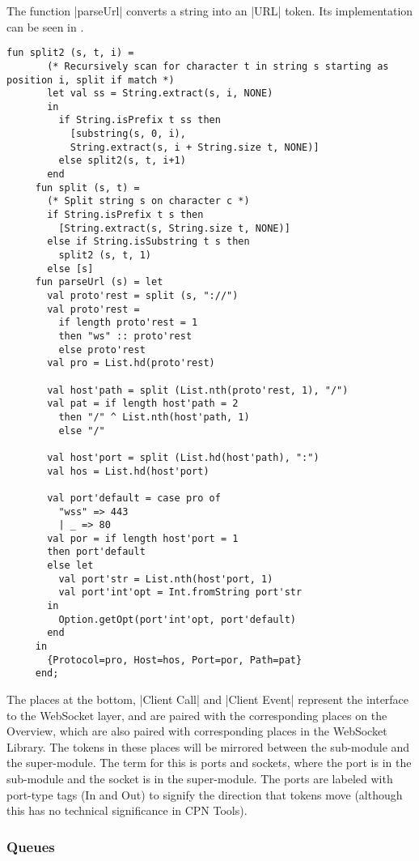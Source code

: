 	The function |parseUrl| converts a string into an |URL| token. Its
	implementation can be seen in . 
	
	\begin{lstlisting}[label=lst:client_app_parseUrl,caption=parseUrl and related
	functions,gobble=1,float] 
	fun split2 (s, t, i) =
	   (* Recursively scan for character t in string s starting as position i, split if match *)
	   let val ss = String.extract(s, i, NONE) 
	   in 
	     if String.isPrefix t ss then
	       [substring(s, 0, i), 
	       String.extract(s, i + String.size t, NONE)]
	     else split2(s, t, i+1)
	   end
	 fun split (s, t) = 
	   (* Split string s on character c *)
	   if String.isPrefix t s then
	     [String.extract(s, String.size t, NONE)]
	   else if String.isSubstring t s then
	     split2 (s, t, 1)
	   else [s]
	 fun parseUrl (s) = let
	   val proto'rest = split (s, "://")
	   val proto'rest = 
	     if length proto'rest = 1 
	     then "ws" :: proto'rest 
	     else proto'rest 
	   val pro = List.hd(proto'rest)
	 
	   val host'path = split (List.nth(proto'rest, 1), "/")
	   val pat = if length host'path = 2
	     then "/" ^ List.nth(host'path, 1)
	     else "/"
	   
	   val host'port = split (List.hd(host'path), ":")
	   val hos = List.hd(host'port)
	 
	   val port'default = case pro of
	     "wss" => 443
	     | _ => 80
	   val por = if length host'port = 1 
	   then port'default
	   else let
	     val port'str = List.nth(host'port, 1)
	     val port'int'opt = Int.fromString port'str
	   in
	     Option.getOpt(port'int'opt, port'default)
	   end
	 in
	   {Protocol=pro, Host=hos, Port=por, Path=pat}
	 end;
	\end{lstlisting}
	
	The places at the bottom, |Client Call| and |Client Event| represent the
	interface to the WebSocket layer, and are paired with the corresponding places
	on the Overview, which are also paired with corresponding places in the
	WebSocket Library. The tokens in these places will be mirrored between the
	sub-module and the super-module. The term for this is ports and sockets,
	where the port is in the sub-module and the socket is in the super-module. The
	ports are labeled with port-type tags (In and Out) to signify the direction
	that tokens move (although this has no technical significance in CPN Tools).
	
	
	\subsubsection{Queues}
	
